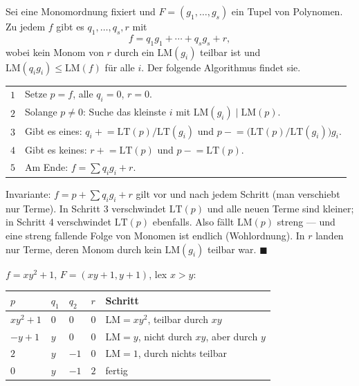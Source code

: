 \begin{merksatz}
Sei eine Monomordnung fixiert und $F = (g_1, \ldots, g_s)$ ein Tupel von Polynomen. Zu jedem $f$ gibt es $q_1, \ldots, q_s, r$ mit
\[ f = q_1g_1 + \cdots + q_sg_s + r , \]
wobei kein Monom von $r$ durch ein $\mathrm{LM}(g_i)$ teilbar ist und $\mathrm{LM}(q_ig_i)\le\mathrm{LM}(f)$ für alle $i$. Der folgende Algorithmus findet sie.

\begin{center}
{\small
\renewcommand{\arraystretch}{1.5}
\begin{tabular}{@{}P{0.8cm}P{8.0cm}@{}}
\toprule
$1$ & Setze $p = f$, alle $q_i = 0$, $r = 0$.\\
$2$ & Solange $p\ne0$: Suche das kleinste $i$ mit $\mathrm{LM}(g_i)\mid\mathrm{LM}(p)$.\\
$3$ & Gibt es eines: $q_i\mathrel{+}= \mathrm{LT}(p)/\mathrm{LT}(g_i)$ und $p\mathrel{-}= \bigl(\mathrm{LT}(p)/\mathrm{LT}(g_i)\bigr)g_i$.\\
$4$ & Gibt es keines: $r\mathrel{+}= \mathrm{LT}(p)$ und $p\mathrel{-}= \mathrm{LT}(p)$.\\
$5$ & Am Ende: $f = \sum q_ig_i + r$.\\
\bottomrule
\end{tabular}}
\end{center}

Invariante: $f = p + \sum q_ig_i + r$ gilt vor und nach jedem Schritt (man verschiebt nur Terme). In Schritt 3 verschwindet $\mathrm{LT}(p)$ und alle neuen Terme sind kleiner; in Schritt 4 verschwindet $\mathrm{LT}(p)$ ebenfalls. Also fällt $\mathrm{LM}(p)$ streng --- und eine streng fallende Folge von Monomen ist endlich (Wohlordnung). In $r$ landen nur Terme, deren Monom durch kein $\mathrm{LM}(g_i)$ teilbar war. $\blacksquare$

$f = xy^{2} + 1$, $F = (xy + 1, y + 1)$, lex $x > y$:
\begin{center}
{\small
\renewcommand{\arraystretch}{1.46}
\begin{tabular}{@{}P{1.6cm}P{1.2cm}P{1.2cm}P{1.2cm}P{3.0cm}@{}}
\toprule
$p$ & $q_1$ & $q_2$ & $r$ & \textbf{Schritt}\\
\midrule
$xy^{2} + 1$ & $0$ & $0$ & $0$ & $\mathrm{LM} = xy^{2}$, teilbar durch $xy$\\
$-y + 1$ & $y$ & $0$ & $0$ & $\mathrm{LM} = y$, nicht durch $xy$, aber durch $y$\\
$2$ & $y$ & $-1$ & $0$ & $\mathrm{LM} = 1$, durch nichts teilbar\\
$0$ & $y$ & $-1$ & $2$ & fertig\\
\bottomrule
\end{tabular}}
\end{center}


\end{merksatz}
